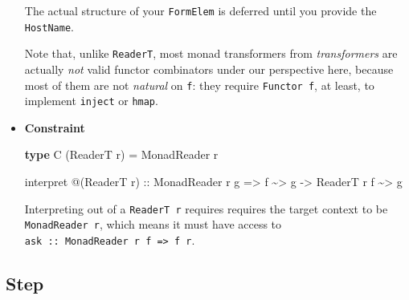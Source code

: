 \documentclass[]{article}
\newenvironment{Shaded}{}{}
\newcommand{\DataTypeTok}[1]{\textcolor[rgb]{0.56,0.13,0.00}{#1}}
\newcommand{\KeywordTok}[1]{\textcolor[rgb]{0.00,0.44,0.13}{\textbf{#1}}}
\newcommand{\NormalTok}[1]{#1}
\newcommand{\OperatorTok}[1]{\textcolor[rgb]{0.40,0.40,0.40}{#1}}
\newcommand{\OtherTok}[1]{\textcolor[rgb]{0.00,0.44,0.13}{#1}}
\begin{document}
\begin{itemize}
  The actual structure of your \texttt{FormElem} is deferred until you provide
  the \texttt{HostName}.

  Note that, unlike \texttt{ReaderT}, most monad transformers from
  \emph{transformers} are actually \emph{not} valid functor combinators under
  our perspective here, because most of them are not \emph{natural} on
  \texttt{f}: they require \texttt{Functor\ f}, at least, to implement
  \texttt{inject} or \texttt{hmap}.
\item
  \textbf{Constraint}

\begin{Shaded}
\begin{Highlighting}[]
\KeywordTok{type} \DataTypeTok{C}\NormalTok{ (}\DataTypeTok{ReaderT}\NormalTok{ r) }\OtherTok{=} \DataTypeTok{MonadReader}\NormalTok{ r}

\NormalTok{interpret }\OperatorTok{@}\NormalTok{(}\DataTypeTok{ReaderT}\NormalTok{ r)}
\OtherTok{    ::} \DataTypeTok{MonadReader}\NormalTok{ r g}
    \OtherTok{=>}\NormalTok{ f }\OperatorTok{\textasciitilde{}>}\NormalTok{ g}
    \OtherTok{{-}>} \DataTypeTok{ReaderT}\NormalTok{ r f }\OperatorTok{\textasciitilde{}>}\NormalTok{ g}
\end{Highlighting}
\end{Shaded}

  Interpreting out of a \texttt{ReaderT\ r} requires requires the target context
  to be \texttt{MonadReader\ r}, which means it must have access to
  \texttt{ask\ ::\ MonadReader\ r\ f\ =\textgreater{}\ f\ r}.
\end{itemize}

\hypertarget{step}{%
\subsection{Step}\label{step}}
\end{document}
